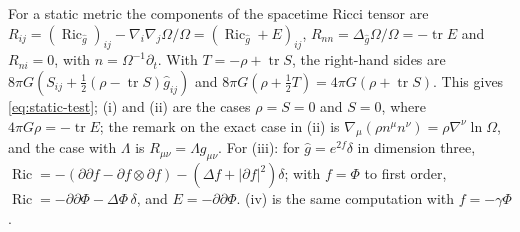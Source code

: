 \documentclass[11pt,a4paper]{article}
\makeatletter
\theoremstyle{stmt}
\theoremstyle{defn}
\theoremstyle{rmk}
\renewenvironment{proof}[1][\proofname]{\par\pushQED{\qed}\normalfont\topsep6\p@\@plus6\p@\relax
  \trivlist\item[\hskip\labelsep{\sffamily\itshape\small #1.}]\ignorespaces}{\popQED\endtrivlist\@endpefalse}
\numberwithin{equation}{section}
\DeclareMathOperator{\tr}{tr}
\DeclareMathOperator{\Ric}{Ric}
\makeatother
\begin{document}
{\begin{proof}
For a static metric the components of the spacetime Ricci tensor are $R_{ij}=(\Ric_{\hat g})_{ij}-\nabla_i\nabla_j\Omega/\Omega=(\Ric_{\hat g}+E)_{ij}$, $R_{nn}=\Delta_{\hat g}\Omega/\Omega=-\tr E$ and $R_{ni}=0$, with $n=\Omega^{-1}\partial_t$. With $T=-\rho+\tr S$, the right-hand sides are $8\pi G(S_{ij}+\tfrac12(\rho-\tr S)\hat g_{ij})$ and $8\pi G(\rho+\tfrac12T)=4\pi G(\rho+\tr S)$. This gives \eqref{eq:static-test}; (i) and (ii) are the cases $\rho=S=0$ and $S=0$, where $4\pi G\rho=-\tr E$; the remark on the exact case in (ii) is $\nabla_\mu(\rho n^\mu n^\nu)=\rho\nabla^\nu\ln\Omega$, and the case with $\Lambda$ is $R_{\mu\nu}=\Lambda g_{\mu\nu}$. For (iii): for $\hat g=e^{2f}\delta$ in dimension three, $\Ric=-(\partial\partial f-\partial f\otimes\partial f)-(\Delta f+|\partial f|^2)\delta$; with $f=\Phi$ to first order, $\Ric=-\partial\partial\Phi-\Delta\Phi\,\delta$, and $E=-\partial\partial\Phi$. (iv) is the same computation with $f=-\gamma\Phi$.
\end{proof}
}
\end{document}
